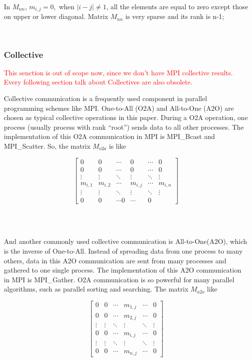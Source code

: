 \documentclass[conference]{IEEEtran}
\begin{document}
In $M_{nn}$, $m_{i,j} = 0,$ when $|i-j|\neq 1$, all the elements are equal to zero except those on upper or lower diagonal. Matrix $M_{nn}$ is very sparse and its rank is n-1;

 
\subsubsection{Collective}
\label{sec:one-to-allandall-to-one}
\textcolor{red}{This senction is out of scope now, since we don't have MPI collective results. Every following section talk about Collectives are also obsolete.}


Collective communication is a frequently used component in parallel programming schemes like MPI.  One-to-All (O2A) and All-to-One (A2O) are chosen as typical collective operations in this paper. During a O2A operation, one process (usually process with rank ``root'') sends data to all other processes. The implementation of this O2A communication in MPI is MPI\_Bcast and MPI\_Scatter. So, the matrix $M_{o2a}$ is like

\begin{displaymath}
 \begin{bmatrix}
  0 & 0 &\cdots & 0 &\cdots & 0\\
  0 & 0 &\cdots & 0 &\cdots & 0\\
  \vdots  & \vdots & \ddots & \vdots & \ddots & \vdots \\
  m_{i,1} & m_{i,2} & \cdots & m_{i,j} &\cdots & m_{i,n}\\
  \vdots  & \vdots & \ddots & \vdots & \ddots & \vdots \\
  0 & 0 & \cdots 0 &\cdots & 0
\end{bmatrix} 
\end{displaymath} 

 

And another commonly used collective communication is All-to-One(A2O), which is the inverse of One-to-All. Instead of spreading data from one process to many others, data in this A2O communication are sent from many processes and gathered to one single process. The implementation of this A2O communication in MPI is MPI\_Gather. O2A communication is so powerful for many parallel algorithms, such as parallel sorting and searching. The matrix $M_{a2o}$ like

\begin{displaymath}
\begin{bmatrix}
  0 & 0 &\cdots & m_{1,j} &\cdots & 0\\
  0 & 0 &\cdots & m_{2,j} &\cdots & 0\\
  \vdots  & \vdots & \ddots & \vdots & \ddots & \vdots \\
  0 & 0 & \cdots & m_{i,j} &\cdots & 0\\
  \vdots  & \vdots & \ddots & \vdots & \ddots & \vdots \\
  0 & 0 & \cdots & m_{n, j} &\cdots & 0
\end{bmatrix}  
\end{displaymath}
\end{document}
